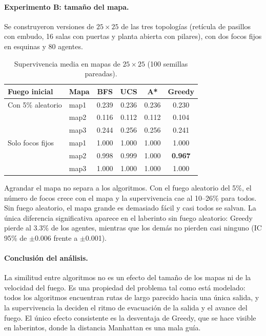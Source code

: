 \documentclass[11pt,a4paper]{article}
\begin{document}
\paragraph{Experimento B: tamaño del mapa.} Se construyeron versiones de $25\times25$ de las tres topologías (retícula de pasillos con embudo, 16 salas con puertas y planta abierta con pilares), con dos focos fijos en esquinas y 80 agentes.

\begin{table}[H]
\centering
\caption{Supervivencia media en mapas de $25\times25$ (100 semillas pareadas).}
\label{tab:sens-tamano}
\begin{tabular}{llcccc}
\toprule
Fuego inicial & Mapa & BFS & UCS & A* & Greedy \\
\midrule
Con 5\% aleatorio & map1 & 0.239 & 0.236 & 0.236 & 0.230 \\
                  & map2 & 0.116 & 0.112 & 0.112 & 0.104 \\
                  & map3 & 0.244 & 0.256 & 0.256 & 0.241 \\
\midrule
Solo focos fijos  & map1 & 1.000 & 1.000 & 1.000 & 1.000 \\
                  & map2 & 0.998 & 0.999 & 1.000 & \textbf{0.967} \\
                  & map3 & 1.000 & 1.000 & 1.000 & 1.000 \\
\bottomrule
\end{tabular}
\end{table}

Agrandar el mapa no separa a los algoritmos. Con el fuego aleatorio del 5\%, el número de focos crece con el mapa y la supervivencia cae al 10--26\% para todos. Sin fuego aleatorio, el mapa grande es demasiado fácil y casi todos se salvan. La única diferencia significativa aparece en el laberinto sin fuego aleatorio: Greedy pierde al 3.3\% de los agentes, mientras que los demás no pierden casi ninguno (IC 95\% de $\pm$0.006 frente a $\pm$0.001).

\paragraph{Conclusión del análisis.} La similitud entre algoritmos no es un efecto del tamaño de los mapas ni de la velocidad del fuego. Es una propiedad del problema tal como está modelado: todos los algoritmos encuentran rutas de largo parecido hacia una única salida, y la supervivencia la deciden el ritmo de evacuación de la salida y el avance del fuego. El único efecto consistente es la desventaja de Greedy, que se hace visible en laberintos, donde la distancia Manhattan es una mala guía.
\end{document}
